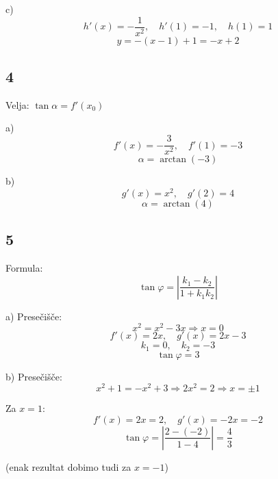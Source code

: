 \documentclass[a4paper,12pt]{article}
\begin{document}
c)
\[
h'(x)=-\frac{1}{x^2},\quad h'(1)=-1,\quad h(1)=1
\]
\[
y=-(x-1)+1=-x+2
\]

\subsection*{4}
Velja: $\tan \alpha = f'(x_0)$

a)
\[
f'(x)=-\frac{3}{x^2},\quad f'(1)=-3
\]
\[
\alpha=\arctan(-3)
\]

b)
\[
g'(x)=x^2,\quad g'(2)=4
\]
\[
\alpha=\arctan(4)
\]

\subsection*{5}
Formula:
\[
\tan \varphi = \left|\frac{k_1-k_2}{1+k_1k_2}\right|
\]

a)
Presečišče:
\[
x^2=x^2-3x \Rightarrow x=0
\]
\[
f'(x)=2x,\quad g'(x)=2x-3
\]
\[
k_1=0,\quad k_2=-3
\]
\[
\tan \varphi = 3
\]

b)
Presečišče:
\[
x^2+1=-x^2+3 \Rightarrow 2x^2=2 \Rightarrow x=\pm1
\]

Za $x=1$:
\[
f'(x)=2x=2,\quad g'(x)=-2x=-2
\]
\[
\tan \varphi = \left|\frac{2-(-2)}{1-4}\right|=\frac{4}{3}
\]

(enak rezultat dobimo tudi za $x=-1$)
\end{document}
